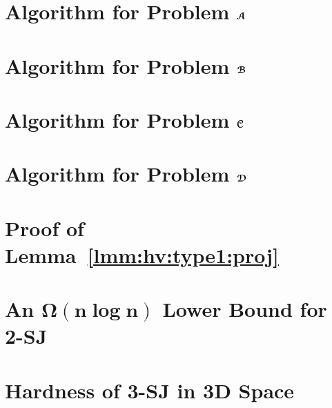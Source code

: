 \documentclass[sigconf]{acmart}
\begin{document}
\section{Algorithm for Problem $\textrm{\boldmath${\EuScript{A}}$}$} \label{app:prob-a}

\section{Algorithm for Problem $\textrm{\boldmath${\EuScript{B}}$}$} \label{app:prob-b}

\section{Algorithm for Problem $\textrm{\boldmath${\EuScript{C}}$}$} \label{app:prob-c}

\section{Algorithm for Problem $\textrm{\boldmath${\EuScript{D}}$}$} \label{app:prob-d}

\section{Proof of Lemma~\ref{lmm:hv:type1:proj}} \label{app:lmm:hv:type1:proj}

\section{An $\bm{\Omega(n \log n)}$ Lower Bound for 2-SJ} \label{app:lb}

\section{Hardness of 3-SJ in 3D Space} \label{app:lb-cond}

\end{document}
